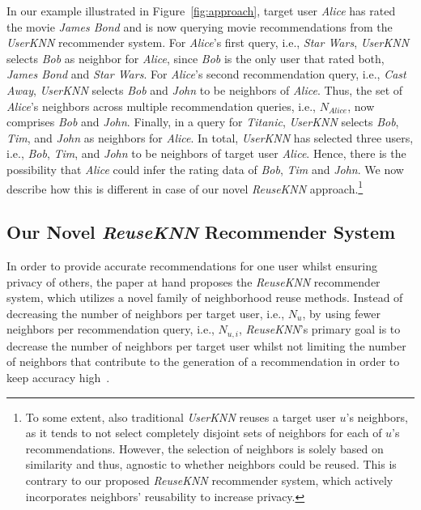 \documentclass[manuscript,review,anonymous]{acmart}
\begin{document}
In our example illustrated in Figure~\ref{fig:approach}, target user \emph{Alice} has rated the movie \emph{James Bond} and is now querying movie recommendations from the \emph{UserKNN} recommender system.
For \emph{Alice}'s first query, i.e., \emph{Star Wars}, \emph{UserKNN} selects \emph{Bob} as neighbor for \emph{Alice}, since \emph{Bob} is the only user that rated both, \emph{James Bond} and \emph{Star Wars}.
For \emph{Alice}'s second recommendation query, i.e., \emph{Cast Away}, \emph{UserKNN} selects \emph{Bob} and \emph{John} to be neighbors of \emph{Alice}.
Thus, the set of \emph{Alice}'s neighbors across multiple recommendation queries, i.e., $N_{Alice}$, now comprises \emph{Bob} and \emph{John}.
Finally, in a query for \emph{Titanic}, \emph{UserKNN} selects \emph{Bob}, \emph{Tim}, and \emph{John} as neighbors for \emph{Alice}.
In total, \emph{UserKNN} has selected three users, i.e., \emph{Bob}, \emph{Tim}, and \emph{John} to be neighbors of target user \emph{Alice}.
Hence, there is the possibility that \emph{Alice} could infer the rating data of \emph{Bob}, \emph{Tim} and \emph{John}. 
We now describe how this is different in case of our novel \emph{ReuseKNN} approach.\footnote{To some extent, also traditional \emph{UserKNN} reuses a target user $u$'s neighbors, as it tends to not select completely disjoint sets of neighbors for each of $u$'s recommendations.
However, the selection of neighbors is solely based on similarity and thus, agnostic to whether neighbors could be reused. This is contrary to our proposed \emph{ReuseKNN} recommender system, which actively incorporates neighbors' reusability to increase privacy.}


\subsection{Our Novel \emph{ReuseKNN} Recommender System}
\label{subsec:reuseknn}
In order to provide accurate recommendations for one user whilst ensuring privacy of others, the paper at hand proposes the \emph{ReuseKNN} recommender system, which utilizes a novel family of neighborhood reuse methods.
Instead of decreasing the number of neighbors per target user, i.e., $N_u$, by using fewer neighbors per recommendation query, i.e., $N_{u, i}$, \emph{ReuseKNN}'s primary goal is to decrease the number of neighbors per target user whilst not limiting the number of neighbors that contribute to the generation of a recommendation in order to keep accuracy high~\cite{herlocker1999algorithmic,herlocker2002empirical}.
\end{document}
